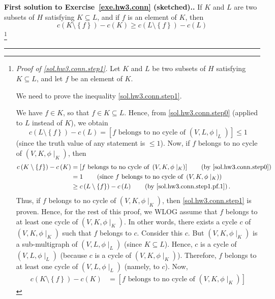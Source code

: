 \documentclass[numbers=enddot,12pt,final,onecolumn,notitlepage]{scrartcl}%
\theoremstyle{definition}
\newenvironment{proof}[1][Proof]{\noindent\textbf{#1.} }{\ \rule{0.5em}{0.5em}}
\newcommand{\set}[1]{\left\{ #1 \right\}}
\newcommand{\tup}[1]{\left( #1 \right)}
\newcommand{\ive}[1]{\left[ #1 \right]}
\begin{document}
\begin{proof}[First solution to Exercise~\ref{exe.hw3.conn}
(sketched).]
If $K$ and $L$ are two subsets of $H$ satisfying
$K \subseteq L$, and if $f$ is an element of $K$, then
\begin{equation}
c\tup{K \setminus \set{f}} - c\tup{K}
\geq c\tup{L \setminus \set{f}} - c\tup{L}
\label{sol.hw3.conn.step1}
\end{equation}
\footnote{\textit{Proof of \eqref{sol.hw3.conn.step1}.}
  Let $K$ and $L$ be two subsets of $H$ satisfying
  $K \subseteq L$, and let $f$ be an element of $K$.
  \par
  We need to prove the inequality \eqref{sol.hw3.conn.step1}.
  \par
  We have $f \in K$, so that $f \in K \subseteq L$.
  Hence,
  from \eqref{sol.hw3.conn.step0} (applied to $L$ instead of $K$), we
  obtain
  \begin{equation}
  c\tup{L \setminus \set{f}} - c\tup{L}
  = \ive{f \text{ belongs to no cycle of } \tup{V, L, \phi\mid_L}}
  \leq 1
  \label{sol.hw3.conn.step1.pf.1}
  \end{equation}
  (since the truth value of any statement is $\leq 1$).
  Now, if $f$ belongs to no cycle of
  $\tup{V, K, \phi\mid_K}$, then
  \begin{align*}
  c\tup{K \setminus \set{f}} - c\tup{K}
  &= \ive{f \text{ belongs to no cycle of } \tup{V, K, \phi\mid_K}}
  \qquad \left(\text{by \eqref{sol.hw3.conn.step0}}\right) \\
  &= 1
  \qquad \left(\text{since } f
                \text{ belongs to no cycle of }
                \tup{V, K, \phi\mid_K} \right) \\
  &\geq c\tup{L \setminus \set{f}} - c\tup{L}
  \qquad \left(\text{by \eqref{sol.hw3.conn.step1.pf.1}}\right) .
  \end{align*}
  Thus, if $f$ belongs to no cycle of
  $\tup{V, K, \phi\mid_K}$, then \eqref{sol.hw3.conn.step1} is
  proven.
  Hence, for the rest of this proof, we WLOG assume that $f$
  belongs to at least one cycle of $\tup{V, K, \phi\mid_K}$.
  In other words, there exists a cycle $c$ of
  $\tup{V, K, \phi\mid_K}$ such that $f$ belongs to $c$.
  Consider this $c$.
  But $\tup{V, K, \phi\mid_K}$ is a sub-multigraph of
  $\tup{V, L, \phi\mid_L}$ (since $K \subseteq L$).
  Hence, $c$ is a cycle of $\tup{V, L, \phi\mid_L}$ (because
  $c$ is a cycle of $\tup{V, K, \phi\mid_K}$).
  Therefore, $f$ belongs to at least one cycle of
  $\tup{V, L, \phi\mid_L}$ (namely, to $c$).
  Now, 
  \begin{align*}
  c\tup{K \setminus \set{f}} - c\tup{K}
  &= \ive{f \text{ belongs to no cycle of } \tup{V, K, \phi\mid_K}}

\end{align*}}
\end{proof}
\end{document}
